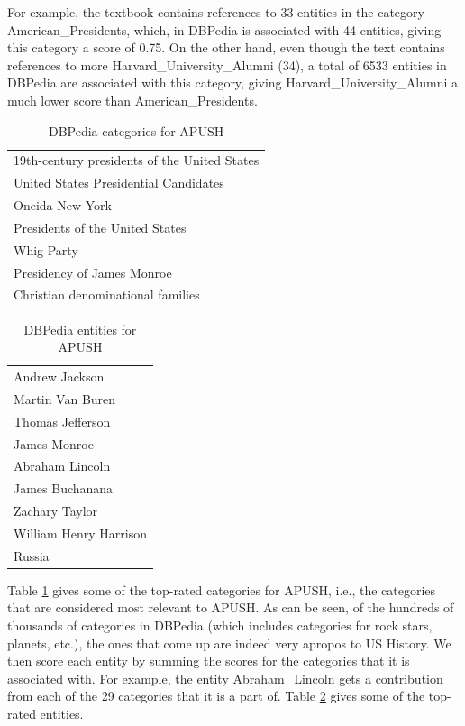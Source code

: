 \documentclass{acm_proc_article-sp}
\begin{document}
For example, the textbook contains references to 33 entities in the category
American\_Presidents, which, in DBPedia is associated with 44 entities, giving
this category a score of 0.75. On the other hand, even though the text contains
references to more Harvard\_University\_Alumni (34), a total of 6533 entities in
DBPedia are associated with this category, giving Harvard\_University\_Alumni a
much lower score than American\_Presidents. 

\begin{table}
\begin{center}
\begin{tabular}{|l|} \hline
19th-century presidents of the United States \\
United States Presidential Candidates \\
Oneida New York \\
Presidents of the United States \\
Whig Party \\
Presidency of James Monroe \\
Christian denominational families \\
\hline \end{tabular}
\caption{DBPedia categories for APUSH}
\label{tab-categories}
\end{center}
\end{table}

\begin{table}
\begin{center}
\begin{tabular}{|l|} \hline
Andrew Jackson \\
Martin Van Buren \\
Thomas Jefferson \\
James Monroe \\
Abraham Lincoln \\
James Buchanana \\
Zachary Taylor \\
William Henry Harrison \\
Russia \\
\hline\end{tabular}
\caption{DBPedia entities for APUSH}
\label{tab-entities}
\end{center}
\end{table}

Table \ref{tab-categories} gives some of the top-rated
categories for APUSH, i.e., the categories that are considered most relevant to
APUSH. As can be seen, of the hundreds of thousands of categories in
DBPedia (which includes categories for rock stars, planets, etc.), the
ones that come up are indeed very apropos to US History.           
We then score each entity by summing the scores for the categories that it is
associated with. For example, the entity Abraham\_Lincoln gets a contribution
from each of the 29 categories that it is a part of. Table \ref{tab-entities}
gives some of the top-rated entities. 
\end{document}
